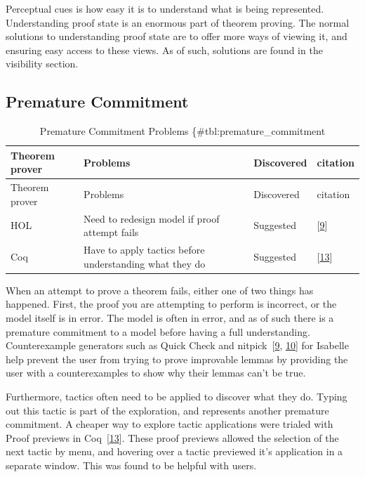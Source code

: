 \documentclass[
]{article}
\begin{document}
Perceptual cues is how easy it is to understand what is being
represented. Understanding proof state is an enormous part of theorem
proving. The normal solutions to understanding proof state are to offer
more ways of viewing it, and ensuring easy access to these views. As of
such, solutions are found in the visibility section.

\hypertarget{premature-commitment-1}{%
\subsection{Premature Commitment}\label{premature-commitment-1}}

\begin{longtable}[]{@{}llll@{}}
\caption{Premature Commitment Problems
\{\#tbl:premature\_commitment}\tabularnewline
\toprule
Theorem prover & Problems & Discovered & citation \\
\midrule
\endfirsthead
\toprule
Theorem prover & Problems & Discovered & citation \\
\midrule
\endhead
HOL & Need to redesign model if proof attempt fails & Suggested &
{[}\protect\hyperlink{ref-beckert_usability_2015}{9}{]} \\
Coq & Have to apply tactics before understanding what they do &
Suggested & {[}\protect\hyperlink{ref-berman_development_2014}{13}{]} \\
\bottomrule
\end{longtable}

When an attempt to prove a theorem fails, either one of two things has
happened. First, the proof you are attempting to perform is incorrect,
or the model itself is in error. The model is often in error, and as of
such there is a premature commitment to a model before having a full
understanding. Counterexample generators such as Quick Check and
nitpick~{[}\protect\hyperlink{ref-beckert_usability_2015}{9},
\protect\hyperlink{ref-beckert_interaction_2017}{10}{]} for Isabelle
help prevent the user from trying to prove improvable lemmas by
providing the user with a counterexamples to show why their lemmas can't
be true.

Furthermore, tactics often need to be applied to discover what they do.
Typing out this tactic is part of the exploration, and represents
another premature commitment. A cheaper way to explore tactic
applications were trialed with Proof previews in
Coq~{[}\protect\hyperlink{ref-berman_development_2014}{13}{]}. These
proof previews allowed the selection of the next tactic by menu, and
hovering over a tactic previewed it's application in a separate window.
This was found to be helpful with users.
\end{document}
